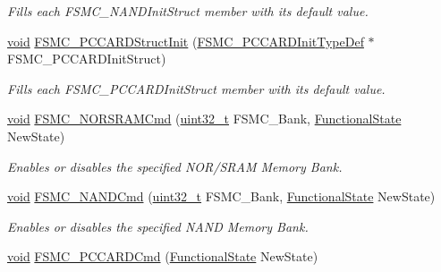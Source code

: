 \begin{DoxyCompactItemize}
\begin{DoxyCompactList}\small\item\em Fills each F\+S\+M\+C\+\_\+\+N\+A\+N\+D\+Init\+Struct member with its default value. \end{DoxyCompactList}\item 
\hyperlink{usb__devapi_8h_afabf60e7f57651d6d595a02c75f07cd0}{void} \hyperlink{group___f_s_m_c___private___functions_ga7a64ba0e0545b3f1913c9d1d28c05e62}{F\+S\+M\+C\+\_\+\+P\+C\+C\+A\+R\+D\+Struct\+Init} (\hyperlink{struct_f_s_m_c___p_c_c_a_r_d_init_type_def}{F\+S\+M\+C\+\_\+\+P\+C\+C\+A\+R\+D\+Init\+Type\+Def} $\ast$F\+S\+M\+C\+\_\+\+P\+C\+C\+A\+R\+D\+Init\+Struct)
\begin{DoxyCompactList}\small\item\em Fills each F\+S\+M\+C\+\_\+\+P\+C\+C\+A\+R\+D\+Init\+Struct member with its default value. \end{DoxyCompactList}\item 
\hyperlink{usb__devapi_8h_afabf60e7f57651d6d595a02c75f07cd0}{void} \hyperlink{group___f_s_m_c___private___functions_gaf943f0f2680168d3a95a3c2c9f3eca2a}{F\+S\+M\+C\+\_\+\+N\+O\+R\+S\+R\+A\+M\+Cmd} (\hyperlink{_p_e___types_8h_a33594304e786b158f3fb30289278f5af}{uint32\+\_\+t} F\+S\+M\+C\+\_\+\+Bank, \hyperlink{agilefox_2library_2inc_2stm32f10x__type_8h_ac9a7e9a35d2513ec15c3b537aaa4fba1}{Functional\+State} New\+State)
\begin{DoxyCompactList}\small\item\em Enables or disables the specified N\+O\+R/\+S\+R\+AM Memory Bank. \end{DoxyCompactList}\item 
\hyperlink{usb__devapi_8h_afabf60e7f57651d6d595a02c75f07cd0}{void} \hyperlink{group___f_s_m_c___private___functions_ga33ec7c39ea4d42e92c72c6e517d8235c}{F\+S\+M\+C\+\_\+\+N\+A\+N\+D\+Cmd} (\hyperlink{_p_e___types_8h_a33594304e786b158f3fb30289278f5af}{uint32\+\_\+t} F\+S\+M\+C\+\_\+\+Bank, \hyperlink{agilefox_2library_2inc_2stm32f10x__type_8h_ac9a7e9a35d2513ec15c3b537aaa4fba1}{Functional\+State} New\+State)
\begin{DoxyCompactList}\small\item\em Enables or disables the specified N\+A\+ND Memory Bank. \end{DoxyCompactList}\item 
\hyperlink{usb__devapi_8h_afabf60e7f57651d6d595a02c75f07cd0}{void} \hyperlink{group___f_s_m_c___private___functions_ga2d410151ceb3428c6a1bf374a0472cde}{F\+S\+M\+C\+\_\+\+P\+C\+C\+A\+R\+D\+Cmd} (\hyperlink{agilefox_2library_2inc_2stm32f10x__type_8h_ac9a7e9a35d2513ec15c3b537aaa4fba1}{Functional\+State} New\+State)

\end{DoxyCompactItemize}
